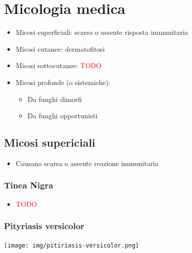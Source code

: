 \documentclass[italian,]{article}
\providecommand{\tightlist}{%
  \setlength{\itemsep}{0pt}\setlength{\parskip}{0pt}}
\newcommand{\TODO}[1]{\textcolor{red}{\textsf{\footnotesize{TODO #1}}}} %
\begin{document}
\hypertarget{micologia-medica}{%
\section{Micologia medica}\label{micologia-medica}}

\begin{itemize}
\tightlist
\item
  Micosi superficiali: scarsa o assente risposta immunitaria
\item
  Micosi cutanee: dermatofitosi
\item
  Micosi sottocutanee: \TODO{}
\item
  Micosi profonde (o sistemiche):

  \begin{itemize}
  \tightlist
  \item
    Da funghi dimorfi
  \item
    Da funghi opportunisti
  \end{itemize}
\end{itemize}

\hypertarget{micosi-supericiali}{%
\subsection{Micosi supericiali}\label{micosi-supericiali}}

\begin{itemize}
\tightlist
\item
  Causano scarsa o assente reazione immunitaria
\end{itemize}

\hypertarget{tinea-nigra}{%
\subsubsection{Tinea Nigra}\label{tinea-nigra}}

\begin{itemize}
\item
  \TODO{}
\end{itemize}

\hypertarget{pityriasis-versicolor}{%
\subsubsection{Pityriasis versicolor}\label{pityriasis-versicolor}}

\texttt{[image: img/pitiriasis-versicolor.png]}~
\end{document}
